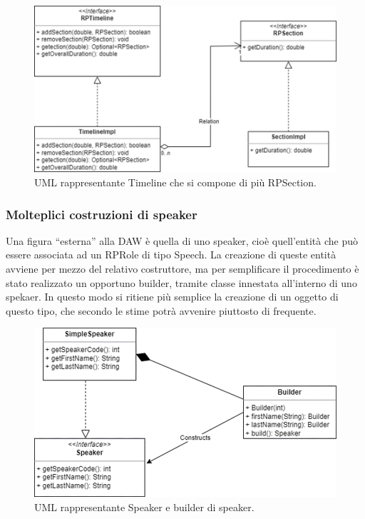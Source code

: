 \documentclass[a4paper,12pt]{report}
\begin{document}
\begin{figure}[H]
\centering{}
\includegraphics[scale=0.9]{img/timeline.png}
\caption{UML rappresentante Timeline che si compone di più RPSection.}
\end{figure}

\subsubsection{Molteplici costruzioni di speaker}
Una figura “esterna” alla DAW è quella di uno speaker, cioè quell’entità che può essere associata ad un RPRole di tipo Speech. La creazione di queste entità avviene per mezzo del relativo costruttore, ma per semplificare il procedimento è stato realizzato un opportuno builder, tramite classe innestata all’interno di uno spekaer. In questo modo si ritiene più semplice la creazione di un oggetto di questo tipo, che secondo le stime potrà avvenire piuttosto di frequente.

\begin{figure}[h]
\centering{}
\includegraphics[scale=0.9]{img/speaker.png}
\caption{UML rappresentante Speaker e builder di speaker.}
\end{figure}
\end{document}

